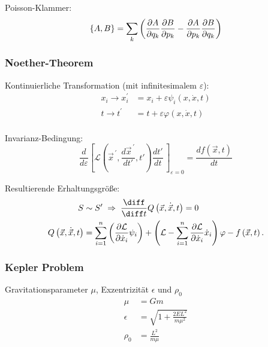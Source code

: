 \documentclass[11pt]{article}
\numberwithin{equation}{section}
\begin{document}
        Poisson-Klammer:
        \begin{equation}
          \lbrace A, B \rbrace = \sum_k \left(
            \frac{\partial A}{\partial q_k}\frac{\partial B}{\partial p_k} - \frac{\partial A}{\partial p_k}\frac{\partial B}{\partial q_k}
          \right)
        \end{equation}

      \subsubsection{Noether-Theorem}
        Kontinuierliche Transformation (mit infinitesimalem $\varepsilon$):
        \begin{equation}
          \begin{aligned}
          x_i \rightarrow x_{i}^{\prime} &= x_i+\varepsilon\psi_i\left(x,\dot{x},t\right) \\
            t\rightarrow t^{\prime}\, &= t+\varepsilon\varphi\left(x,\dot{x},t\right) \\
          \end{aligned}
        \end{equation}

        Invarianz-Bedingung:
        \begin{equation}
          \frac{d}{d\varepsilon}\left[\mathcal{L}\left( {\vec{x}}^{\,\prime},\frac{d {\vec{x}}^{\,\prime}}{dt'},t'\right) \frac{dt'}{dt}\,\right]_{\varepsilon=0}=\frac{df(\vec{x}, t)}{dt}
        \end{equation}

        Resultierende Erhaltungsgröße:
        \begin{equation}
          \begin{aligned}
            S &\sim S' \;\Rightarrow\;
            \tder{}{t} Q\left(\vec{x},\dot{\vec{x}},t\right) = 0 \\
            Q\left(\vec{x},\dot{\vec{x}},t\right) &= \sum_{i=1}^{n}\left(\frac{\partial\mathcal{L}}{\partial{\dot{x}}_i}\psi_i\right)+\left(\mathcal{L}-\sum_{i=1}^{n}{\frac{\partial\mathcal{L}}{\partial{\dot{x}}_i}{\dot{x}}_i}\right)\varphi - f\left(\vec{x},t\right).
          \end{aligned}
        \end{equation}

      \subsubsection{Kepler Problem}
        Gravitationsparameter $\mu$, Exzentrizität $\epsilon$ und $\rho_0$
        \begin{equation}
          \begin{aligned}
            \mu &= G m \\
            \epsilon &= \sqrt{1+\frac{2 E L^2}{m \mu^2}} \\
            \rho_0 &= \frac{L^2}{m\mu} \\
          \end{aligned}
        \end{equation}
\end{document}
